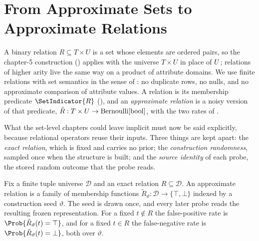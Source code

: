 %

\section{From Approximate Sets to Approximate Relations}
\label{sec:sets-to-relations}

A binary relation $R \subseteq T \times U$ is a set whose elements are ordered
pairs, so the chapter-5 construction () applies with
the universe $T \times U$ in place of $U$; relations of higher arity live
the same way on a product of attribute domains. We use finite relations with set
semantics in the sense of \textcite{codd-1970}: no duplicate rows, no nulls, and
no approximate comparison of attribute values. A relation is its membership
predicate $\SetIndicator{R}$ (), and an
\emph{approximate relation} is a noisy version of
that predicate, $\tilde R : T \times U \to \mathrm{Bernoulli}[\mathrm{bool}]$, with the two
rates of .

What the set-level chapters could leave implicit must now be said explicitly,
because relational operators reuse their inputs. Three things are kept apart:
the \emph{exact relation}, which is fixed and carries no prior; the
\emph{construction randomness}, sampled once when the structure is built; and
the \emph{source identity} of each probe, the stored random outcome that the
probe reads.

\begin{definition}
\label{def:approx-relation}
Fix a finite tuple universe $\mathcal{D}$ and an exact relation $R \subseteq
\mathcal{D}$. An approximate relation is a family of membership functions
$\tilde R_\vartheta : \mathcal{D} \to \{\top, \bot\}$ indexed by a construction
seed $\vartheta$. The seed is drawn once, and every later probe reads the
resulting frozen representation. For a fixed $t \notin R$ the false-positive
rate is $\Prob{\tilde R_\vartheta(t) = \top}$, and for a fixed $t \in R$ the
false-negative rate is $\Prob{\tilde R_\vartheta(t) = \bot}$, both over
$\vartheta$.
\end{definition}

